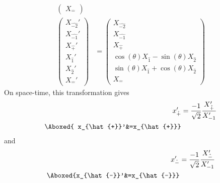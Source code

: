 \documentclass[]{article}
\numberwithin{equation}{section}
\begin{document}
{{\begin{align}
\begin{pmatrix}
    {X}_{\hat{-}}
    \end{pmatrix}\\
    \begin{pmatrix}
    {X}_{\hat{-2}}'\\
    {X}_{\hat{-1}}'\\
    {X}_{\hat{+}}'\\
    {X}_{\hat{1}}'\\
    {X}_{\hat{2}}'\\
    {X}_{\hat{-}}'
    \end{pmatrix}&= \begin{pmatrix}
    {X}_{\hat{-2}}\\
    {X}_{\hat{-1}}\\
    {X}_{\hat{+}}\\
    \cos{(\theta)}{X}_{\hat{1}}-\sin{(\theta)}{X}_{\hat{2}}\\
    \sin{(\theta)}{X}_{\hat{1}}+ \cos{(\theta)}{X}_{\hat{2}}\\
    {X}_{\hat{-}}
    \end{pmatrix}
\end{align}
On space-time, this transformation gives
\begin{align}
    x_{\hat{+}}'&=\frac{-1}{\sqrt{2}}\frac{{X}_{{\hat{+}}}'}{ {X}_{-1}'}\\
    \Aboxed{ x_{\hat{+}}'&=x_{\hat{+}}}
\end{align}
and
\begin{align}
    x_{\hat{-}}'&=\frac{-1}{\sqrt{2}}\frac{{X}_{\hat{-}}'}{ {X}_{-1}'}\\
    \Aboxed{x_{\hat{-}}'&=x_{\hat{-}}}
\end{align}


}}
\end{document}
